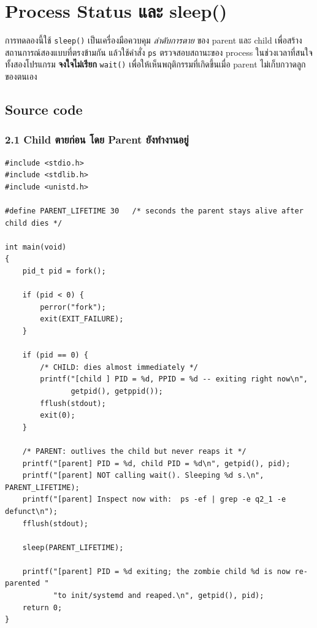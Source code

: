 \documentclass[a4paper,12pt]{article}
\newcommand{\code}[1]{\texttt{#1}}
\begin{document}
\newpage
\section{Process Status และ sleep()}

การทดลองนี้ใช้ \code{sleep()} เป็นเครื่องมือควบคุม \emph{ลำดับการตาย} ของ parent
และ child เพื่อสร้างสถานการณ์สองแบบที่ตรงข้ามกัน แล้วใช้คำสั่ง \code{ps}
ตรวจสอบสถานะของ process ในช่วงเวลาที่สนใจ ทั้งสองโปรแกรม \textbf{จงใจไม่เรียก}
\code{wait()} เพื่อให้เห็นพฤติกรรมที่เกิดขึ้นเมื่อ parent ไม่เก็บกวาดลูกของตนเอง

\subsection{Source code}

\subsubsection{2.1 Child ตายก่อน โดย Parent ยังทำงานอยู่}

\begin{lstlisting}[caption={q2\_1\_child\_first.c -- child dies first, parent never reaps},label={lst:q2_1}]
#include <stdio.h>
#include <stdlib.h>
#include <unistd.h>

#define PARENT_LIFETIME 30   /* seconds the parent stays alive after child dies */

int main(void)
{
    pid_t pid = fork();

    if (pid < 0) {
        perror("fork");
        exit(EXIT_FAILURE);
    }

    if (pid == 0) {
        /* CHILD: dies almost immediately */
        printf("[child ] PID = %d, PPID = %d -- exiting right now\n",
               getpid(), getppid());
        fflush(stdout);
        exit(0);
    }

    /* PARENT: outlives the child but never reaps it */
    printf("[parent] PID = %d, child PID = %d\n", getpid(), pid);
    printf("[parent] NOT calling wait(). Sleeping %d s.\n", PARENT_LIFETIME);
    printf("[parent] Inspect now with:  ps -ef | grep -e q2_1 -e defunct\n");
    fflush(stdout);

    sleep(PARENT_LIFETIME);

    printf("[parent] PID = %d exiting; the zombie child %d is now re-parented "
           "to init/systemd and reaped.\n", getpid(), pid);
    return 0;
}
\end{lstlisting}
\end{document}
